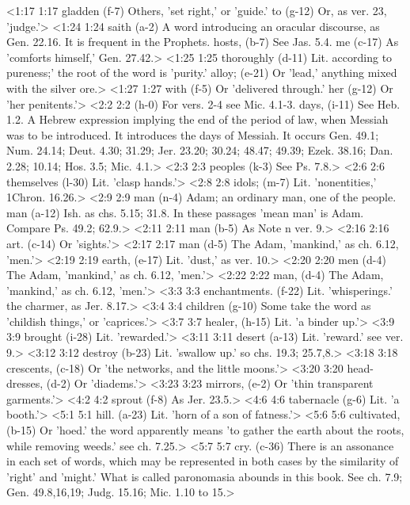 <1:17 1:17  gladden (f-7)  Others, 'set right,' or 'guide.'
  to (g-12)  Or, as ver. 23, 'judge.'>
<1:24 1:24  saith (a-2)  A word introducing an oracular discourse, as Gen. 22.16. It  is frequent in the Prophets.
  hosts, (b-7)  See Jas. 5.4.
  me (c-17)  As 'comforts himself,' Gen. 27.42.>
<1:25 1:25  thoroughly (d-11)  Lit. according to pureness;' the root of the word is  'purity.'
  alloy; (e-21)  Or 'lead,' anything mixed with the silver ore.>
<1:27 1:27  with (f-5)  Or 'delivered through.'
  her (g-12)  Or 'her penitents.'>
<2:2 2:2   (h-0)  For vers. 2-4 see Mic. 4.1-3.
  days, (i-11)  See Heb. 1.2. A Hebrew expression implying the end of the  period of law, when Messiah was to be introduced. It introduces  the days of Messiah. It occurs Gen. 49.1; Num. 24.14; Deut.  4.30; 31.29; Jer. 23.20; 30.24; 48.47; 49.39; Ezek. 38.16; Dan.  2.28; 10.14; Hos. 3.5; Mic. 4.1.>
<2:3 2:3  peoples (k-3)  See Ps. 7.8.>
<2:6 2:6  themselves (l-30)  Lit. 'clasp hands.'>
<2:8 2:8  idols; (m-7)  Lit. 'nonentities,' 1Chron. 16.26.>
<2:9 2:9  man (n-4)  Adam; an ordinary man, one of the people.
  man (a-12)  Ish. as chs. 5.15; 31.8. In these passages 'mean man' is  Adam. Compare Ps. 49.2; 62.9.>
<2:11 2:11  man (b-5)  As Note n ver. 9.>
<2:16 2:16  art. (c-14)  Or 'sights.'>
<2:17 2:17  man (d-5)  The Adam, 'mankind,' as ch. 6.12, 'men.'>
<2:19 2:19  earth, (e-17)  Lit. 'dust,' as ver. 10.>
<2:20 2:20  men (d-4)  The Adam, 'mankind,' as ch. 6.12, 'men.'>
<2:22 2:22  man, (d-4)  The Adam, 'mankind,' as ch. 6.12, 'men.'>
<3:3 3:3  enchantments. (f-22)  Lit. 'whisperings.' the charmer, as Jer. 8.17.>
<3:4 3:4  children (g-10)  Some take the word as 'childish things,' or 'caprices.'>
<3:7 3:7  healer, (h-15)  Lit. 'a binder up.'>
<3:9 3:9  brought (i-28)  Lit. 'rewarded.'>
<3:11 3:11  desert (a-13)  Lit. 'reward.' see ver. 9.>
<3:12 3:12  destroy (b-23)  Lit. 'swallow up.' so chs. 19.3; 25.7,8.>
<3:18 3:18  crescents, (c-18)  Or 'the networks, and the little moons.'>
<3:20 3:20  head-dresses, (d-2)  Or 'diadems.'>
<3:23 3:23  mirrors, (e-2)  Or 'thin transparent garments.'>
<4:2 4:2  sprout (f-8)  As Jer. 23.5.>
<4:6 4:6  tabernacle (g-6)  Lit. 'a booth.'>
<5:1 5:1  hill. (a-23)  Lit. 'horn of a son of fatness.'>
<5:6 5:6  cultivated, (b-15)  Or 'hoed.' the word apparently means 'to gather the earth  about the roots, while removing weeds.' see ch. 7.25.>
<5:7 5:7  cry. (c-36)  There is an assonance in each set of words, which may be  represented in both cases by the similarity of 'right' and  'might.' What is called paronomasia abounds in this book. See  ch. 7.9; Gen. 49.8,16,19; Judg. 15.16; Mic. 1.10 to 15.>
